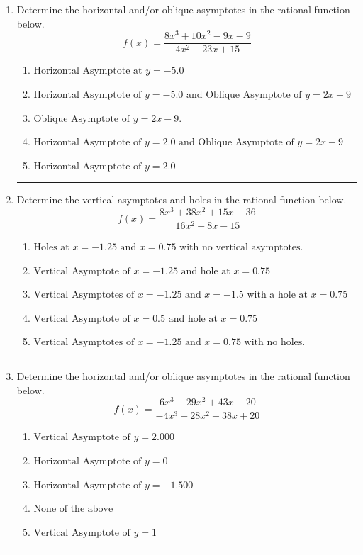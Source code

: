 \documentclass[14pt]{extbook}
\newcommand{\litem}[1]{\item#1\hspace*{-1cm}\rule{\textwidth}{0.4pt}}
\begin{document}
\begin{enumerate}
\litem{
Determine the horizontal and/or oblique asymptotes in the rational function below.\[ f(x) = \frac{8x^{3} +10 x^{2} -9 x -9}{4x^{2} +23 x + 15} \]\begin{enumerate}[label=\Alph*.]
\item \( \text{Horizontal Asymptote at } y = -5.0 \)
\item \( \text{Horizontal Asymptote of } y = -5.0 \text{ and Oblique Asymptote of } y = 2x -9 \)
\item \( \text{Oblique Asymptote of } y = 2x -9. \)
\item \( \text{Horizontal Asymptote of } y = 2.0 \text{ and Oblique Asymptote of } y = 2x -9 \)
\item \( \text{Horizontal Asymptote of } y = 2.0  \)

\end{enumerate} }
\litem{
Determine the vertical asymptotes and holes in the rational function below.\[ f(x) = \frac{8x^{3} +38 x^{2} +15 x -36}{16x^{2} +8 x -15} \]\begin{enumerate}[label=\Alph*.]
\item \( \text{Holes at } x = -1.25 \text{ and } x = 0.75 \text{ with no vertical asymptotes.} \)
\item \( \text{Vertical Asymptote of } x = -1.25 \text{ and hole at } x = 0.75 \)
\item \( \text{Vertical Asymptotes of } x = -1.25 \text{ and } x = -1.5 \text{ with a hole at } x = 0.75 \)
\item \( \text{Vertical Asymptote of } x = 0.5 \text{ and hole at } x = 0.75 \)
\item \( \text{Vertical Asymptotes of } x = -1.25 \text{ and } x = 0.75 \text{ with no holes.} \)

\end{enumerate} }
\litem{
Determine the horizontal and/or oblique asymptotes in the rational function below.\[ f(x) = \frac{6x^{3} -29 x^{2} +43 x -20}{-4x^{3} +28 x^{2} -38 x + 20} \]\begin{enumerate}[label=\Alph*.]
\item \( \text{Vertical Asymptote of } y = 2.000  \)
\item \( \text{Horizontal Asymptote of } y = 0  \)
\item \( \text{Horizontal Asymptote of } y = -1.500  \)
\item \( \text{None of the above} \)
\item \( \text{Vertical Asymptote of } y = 1  \)


\end{enumerate}}
\end{enumerate}
\end{document}
